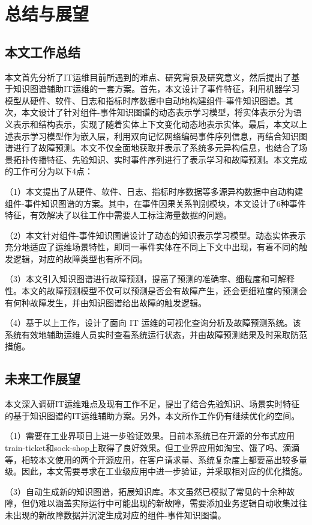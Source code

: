 \chapter{总结与展望}
\section{本文工作总结}
本文首先分析了IT运维目前所遇到的难点、研究背景及研究意义，然后提出了基于知识图谱辅助IT运维的一套方案。首先，本文设计了事件特征，利用机器学习模型从硬件、软件、日志和指标时序数据中自动地构建组件-事件知识图谱。其次，本文设计了针对组件-事件知识图谱的动态表示学习模型，将实体表示分为语义表示和结构表示，实现了随着实体上下文变化动态地表示实体。最后，本文以上述表示学习模型作为嵌入层，利用双向记忆网络编码事件序列信息，再结合知识图谱进行了故障预测。本文不仅全面地获取并表示了系统多元异构信息，也结合了场景拓扑传播特征、先验知识、实时事件序列进行了表示学习和故障预测。本文完成的工作可分为以下4点：

（1）本文提出了从硬件、软件、日志、指标时序数据等多源异构数据中自动构建组件-事件知识图谱的方案。其中，在事件因果关系判别模块，本文设计了6种事件特征，有效解决了以往工作中需要人工标注海量数据的问题。

（2）本文针对组件-事件知识图谱设计了动态的知识表示学习模型。动态实体表示充分地适应了运维场景特性，即同一事件实体在不同上下文中出现，有着不同的触发逻辑，对应的故障类型也有所不同。

（3）本文引入知识图谱进行故障预测，提高了预测的准确率、细粒度和可解释性。本文的故障预测模型不仅可以预测是否会有故障产生，还会更细粒度的预测会有何种故障发生，并由知识图谱给出故障的触发逻辑。

（4）基于以上工作，设计了面向 IT 运维的可视化查询分析及故障预测系统。该系统有效地辅助运维人员实时查看系统运行状态，并由故障预测结果及时采取防范措施。

\section{未来工作展望}
本文深入调研IT运维难点及现有工作不足，提出了结合先验知识、场景实时特征的基于知识图谱的IT运维辅助方案。另外，本文所作工作仍有继续优化的空间。

（1）需要在工业界项目上进一步验证效果。目前本系统已在开源的分布式应用train-ticket和sock-shop上取得了良好效果。但工业界应用如淘宝、饿了吗、滴滴等，相较本文使用的两个开源应用，在客户请求量、系统复杂度上都要高出较多量级。因此，本文需要寻求在工业级应用中进一步验证，并采取相对应的优化措施。

（3）自动生成新的知识图谱，拓展知识库。本文虽然已模拟了常见的十余种故障，但仍难以涵盖实际运行中可能出现的新故障，需要添加业务逻辑自动收集过往未出现的新故障数据并沉淀生成对应的组件-事件知识图谱。